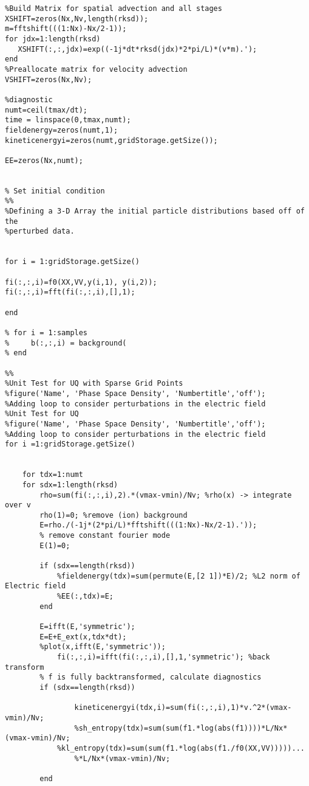 \documentclass{article}
\begin{document}
\begin{lstlisting}
%Build Matrix for spatial advection and all stages
XSHIFT=zeros(Nx,Nv,length(rksd));
m=fftshift(((1:Nx)-Nx/2-1));
for jdx=1:length(rksd)
   XSHIFT(:,:,jdx)=exp((-1j*dt*rksd(jdx)*2*pi/L)*(v*m).');
end
%Preallocate matrix for velocity advection
VSHIFT=zeros(Nx,Nv);

%diagnostic
numt=ceil(tmax/dt);
time = linspace(0,tmax,numt);
fieldenergy=zeros(numt,1);
kineticenergyi=zeros(numt,gridStorage.getSize());

EE=zeros(Nx,numt);


% Set initial condition
%%
%Defining a 3-D Array the initial particle distributions based off of the
%perturbed data.


for i = 1:gridStorage.getSize()
   
fi(:,:,i)=f0(XX,VV,y(i,1), y(i,2));
fi(:,:,i)=fft(fi(:,:,i),[],1);
 
end

% for i = 1:samples
%     b(:,:,i) = background(
% end

%%
%Unit Test for UQ with Sparse Grid Points
%figure('Name', 'Phase Space Density', 'Numbertitle','off');
%Adding loop to consider perturbations in the electric field
%Unit Test for UQ
%figure('Name', 'Phase Space Density', 'Numbertitle','off');
%Adding loop to consider perturbations in the electric field
for i =1:gridStorage.getSize()
    
    
    for tdx=1:numt
    for sdx=1:length(rksd)
        rho=sum(fi(:,:,i),2).*(vmax-vmin)/Nv; %rho(x) -> integrate over v
        rho(1)=0; %remove (ion) background
        E=rho./(-1j*(2*pi/L)*fftshift(((1:Nx)-Nx/2-1).'));
        % remove constant fourier mode
        E(1)=0;

        if (sdx==length(rksd))
            %fieldenergy(tdx)=sum(permute(E,[2 1])*E)/2; %L2 norm of Electric field
            %EE(:,tdx)=E;
        end

        E=ifft(E,'symmetric');
        E=E+E_ext(x,tdx*dt);
        %plot(x,ifft(E,'symmetric'));
            fi(:,:,i)=ifft(fi(:,:,i),[],1,'symmetric'); %back transform
        % f is fully backtransformed, calculate diagnostics
        if (sdx==length(rksd))
            
                kineticenergyi(tdx,i)=sum(fi(:,:,i),1)*v.^2*(vmax-vmin)/Nv;
                %sh_entropy(tdx)=sum(sum(f1.*log(abs(f1))))*L/Nx*(vmax-vmin)/Nv;
            %kl_entropy(tdx)=sum(sum(f1.*log(abs(f1./f0(XX,VV)))))...
                %*L/Nx*(vmax-vmin)/Nv;
            
        end


\end{lstlisting}
\end{document}

